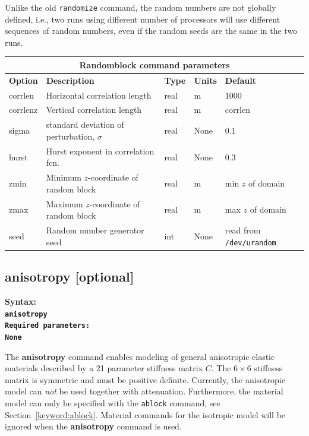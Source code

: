 \documentclass[11pt]{report}
\begin{document}
{Unlike the old {\tt randomize} command, the random numbers are not globally defined, i.e., two runs using
different number of processors will use different sequences of random numbers, even if the random seeds
are the same in the two runs.

\begin{center}
	\begin{tabular}{|l|p{8cm}|l|l||l|} \hline
		\multicolumn{5}{|c|}{\bf Randomblock command parameters}                                                           \\ \hline
		\bf{Option} & \bf{Description}                             & \bf{Type} & \bf{Units} & \bf{Default}                 \\ \hline \hline
		corrlen     & Horizontal correlation length                & real      & m          & 1000                         \\ \hline
		corrlenz    & Vertical correlation length                  & real      & m          & corrlen                      \\ \hline
		sigma       & standard deviation of perturbation, $\sigma$ & real      & None       & 0.1                          \\ \hline
		hurst       & Hurst exponent in correlation fcn.           & real      & None       & 0.3                          \\ \hline
		zmin        & Minimum $z$-coordinate of random block       & real      & m          & min $z$ of domain            \\ \hline
		zmax        & Maximum $z$-coordinate of random block       & real      & m          & max $z$ of domain            \\ \hline
		seed        & Random number generator seed                 & int       & None       & read from {\tt /dev/urandom} \\ \hline
	\end{tabular}
\end{center}


\subsection{anisotropy [optional]}
\label{sec:anisotropy}
\begin{flushleft}\bf
	Syntax:\\
	\tt anisotropy\\
	\bf Required parameters:\\
	\rm None
\end{flushleft}
The {\bf anisotropy} command enables modeling of general anisotropic elastic materials described by
a 21 parameter stiffness matrix $C$. The $6\times 6$ stiffness matrix is symmetric and must be
positive definite. Currently, the anisotropic model can {\em not} be used together with attenuation.
Furthermore, the material model can only be specified with the \verb+ablock+ command, see
Section~\ref{keyword:ablock}. Material commands for the isotropic model will be ignored when
the {\bf anisotropy} command is used.

}
\end{document}
